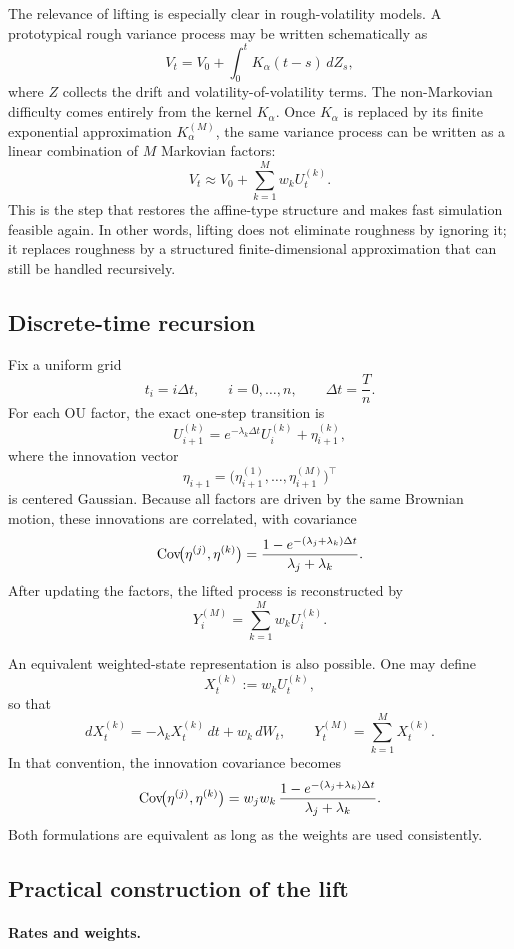 The relevance of lifting is especially clear in rough-volatility models. A prototypical rough variance process may be written schematically as
\[
V_t
=
V_0
+
\int_0^t K_\alpha(t-s)\,dZ_s,
\]
where \(Z\) collects the drift and volatility-of-volatility terms. The non-Markovian difficulty comes entirely from the kernel \(K_\alpha\). Once \(K_\alpha\) is replaced by its finite exponential approximation \(K_\alpha^{(M)}\), the same variance process can be written as a linear combination of \(M\) Markovian factors:
\[
V_t
\approx
V_0+\sum_{k=1}^M w_k U_t^{(k)}.
\]
This is the step that restores the affine-type structure and makes fast simulation feasible again. In other words, lifting does not eliminate roughness by ignoring it; it replaces roughness by a structured finite-dimensional approximation that can still be handled recursively.

\subsection{Discrete-time recursion}

Fix a uniform grid
\[
t_i=i\Delta t,
\qquad i=0,\dots,n,
\qquad \Delta t=\frac{T}{n}.
\]
For each OU factor, the exact one-step transition is
\[
U_{i+1}^{(k)}=e^{-\lambda_k\Delta t}U_i^{(k)}+\eta_{i+1}^{(k)},
\]
where the innovation vector
\[
\eta_{i+1}=
\bigl(\eta_{i+1}^{(1)},\dots,\eta_{i+1}^{(M)}\bigr)^\top
\]
is centered Gaussian. Because all factors are driven by the same Brownian motion, these innovations are correlated, with covariance
\[
\operatorname{Cov}\!\bigl(\eta^{(j)},\eta^{(k)}\bigr)
=
\frac{1-e^{-(\lambda_j+\lambda_k)\Delta t}}{\lambda_j+\lambda_k}.
\]
After updating the factors, the lifted process is reconstructed by
\[
Y_i^{(M)}=\sum_{k=1}^M w_k U_i^{(k)}.
\]

An equivalent weighted-state representation is also possible. One may define
\[
X_t^{(k)}:=w_k U_t^{(k)},
\]
so that
\[
dX_t^{(k)}=-\lambda_k X_t^{(k)}\,dt+w_k\,dW_t,
\qquad
Y_t^{(M)}=\sum_{k=1}^M X_t^{(k)}.
\]
In that convention, the innovation covariance becomes
\[
\operatorname{Cov}\!\bigl(\eta^{(j)},\eta^{(k)}\bigr)
=
w_jw_k\,
\frac{1-e^{-(\lambda_j+\lambda_k)\Delta t}}{\lambda_j+\lambda_k}.
\]
Both formulations are equivalent as long as the weights are used consistently.

\subsection{Practical construction of the lift}

\paragraph{Rates and weights.}

